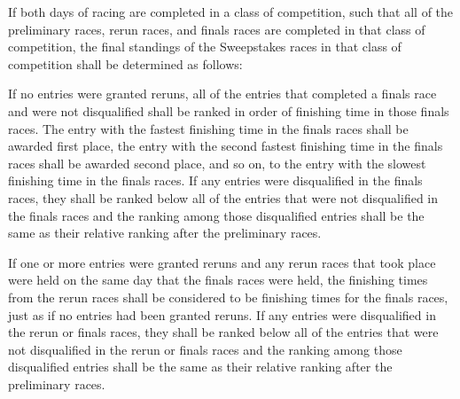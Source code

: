 	If both days of racing are completed in a class of competition, such that all
	of the preliminary races, rerun races, and finals races are completed in that
	class of competition, the final standings of the Sweepstakes races in that
	class of competition shall be determined as follows:

	If no entries were granted reruns, all of the entries that completed a finals
	race and were not disqualified shall be ranked in order of finishing time in
	those finals races. The entry with the fastest finishing time in the finals
	races shall be awarded first place, the entry with the second fastest finishing
	time in the finals races shall be awarded second place, and so on, to the entry
	with the slowest finishing time in the finals races. If any entries were
	disqualified in the finals races, they shall be ranked below all of the entries
	that were not disqualified in the finals races and the ranking among those
	disqualified entries shall be the same as their relative ranking after the
	preliminary races.

	If one or more entries were granted reruns and any rerun races that took place
	were held on the same day that the finals races were held, the finishing times
	from the rerun races shall be considered to be finishing times for the finals
	races, just as if no entries had been granted reruns. If any entries were
	disqualified in the rerun or finals races, they shall be ranked below all of
	the entries that were not disqualified in the rerun or finals races and the
	ranking among those disqualified entries shall be the same as their relative
	ranking after the preliminary races.



